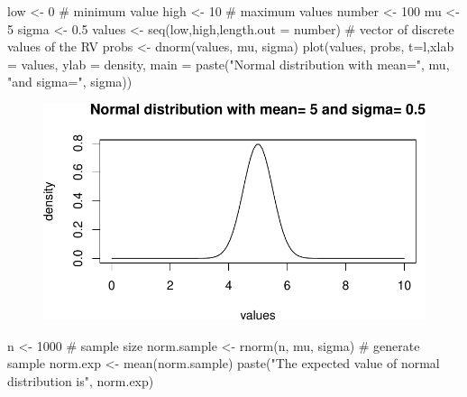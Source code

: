 \documentclass[
  letterpaper,
  DIV=11,
  numbers=noendperiod]{scrreprt}
\newenvironment{Shaded}{\begin{snugshade}}{\end{snugshade}}
\newcommand{\AttributeTok}[1]{\textcolor[rgb]{0.40,0.45,0.13}{#1}}
\newcommand{\CommentTok}[1]{\textcolor[rgb]{0.37,0.37,0.37}{#1}}
\newcommand{\DecValTok}[1]{\textcolor[rgb]{0.68,0.00,0.00}{#1}}
\newcommand{\FloatTok}[1]{\textcolor[rgb]{0.68,0.00,0.00}{#1}}
\newcommand{\FunctionTok}[1]{\textcolor[rgb]{0.28,0.35,0.67}{#1}}
\newcommand{\NormalTok}[1]{\textcolor[rgb]{0.00,0.23,0.31}{#1}}
\newcommand{\OtherTok}[1]{\textcolor[rgb]{0.00,0.23,0.31}{#1}}
\newcommand{\StringTok}[1]{\textcolor[rgb]{0.13,0.47,0.30}{#1}}
\begin{document}
\begin{Shaded}
\begin{Highlighting}[]
\NormalTok{low }\OtherTok{\textless{}{-}} \DecValTok{0} \CommentTok{\# minimum value}
\NormalTok{high }\OtherTok{\textless{}{-}} \DecValTok{10} \CommentTok{\# maximum values}
\NormalTok{number }\OtherTok{\textless{}{-}} \DecValTok{100}
\NormalTok{mu }\OtherTok{\textless{}{-}} \DecValTok{5}
\NormalTok{sigma }\OtherTok{\textless{}{-}} \FloatTok{0.5} 
\NormalTok{values }\OtherTok{\textless{}{-}} \FunctionTok{seq}\NormalTok{(low,high,}\AttributeTok{length.out =}\NormalTok{ number) }\CommentTok{\# vector of discrete values of the RV}
\NormalTok{probs }\OtherTok{\textless{}{-}} \FunctionTok{dnorm}\NormalTok{(values, mu, sigma)}
\FunctionTok{plot}\NormalTok{(values, probs, }\AttributeTok{t=}\StringTok{\textquotesingle{}l\textquotesingle{}}\NormalTok{,}\AttributeTok{xlab =} \StringTok{\textquotesingle{}values\textquotesingle{}}\NormalTok{, }\AttributeTok{ylab =} \StringTok{\textquotesingle{}density\textquotesingle{}}\NormalTok{,}
        \AttributeTok{main =} \FunctionTok{paste}\NormalTok{(}\StringTok{"Normal distribution with mean="}\NormalTok{, mu, }\StringTok{"and sigma="}\NormalTok{, sigma))}
\end{Highlighting}
\end{Shaded}

\begin{figure}[H]

{\centering \includegraphics{./04-distributions_files/figure-pdf/unnamed-chunk-13-1.pdf}

}

\end{figure}

\begin{Shaded}
\begin{Highlighting}[]
\NormalTok{n }\OtherTok{\textless{}{-}} \DecValTok{1000} \CommentTok{\# sample size}
\NormalTok{norm.sample }\OtherTok{\textless{}{-}} \FunctionTok{rnorm}\NormalTok{(n, mu, sigma) }\CommentTok{\# generate sample}
\NormalTok{norm.exp }\OtherTok{\textless{}{-}} \FunctionTok{mean}\NormalTok{(norm.sample)}
\FunctionTok{paste}\NormalTok{(}\StringTok{"The expected value of normal distribution is"}\NormalTok{, norm.exp)}
\end{Highlighting}
\end{Shaded}
\end{document}
